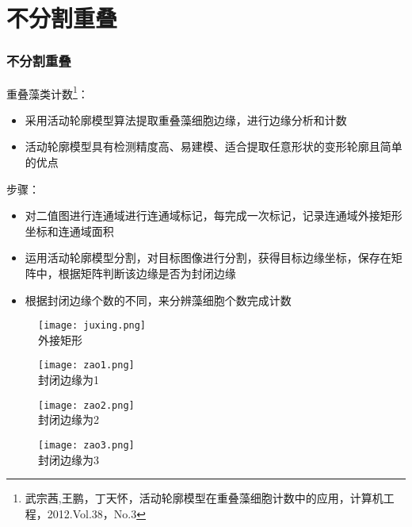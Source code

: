 \documentclass[notheorems,mathserif,table,compress]{beamer}  %
\begin{document}
\section{不分割重叠}
\begin{frame}
    \frametitle{不分割重叠}
    重叠藻类计数\footnote{武宗茜,王鹏，丁天怀，活动轮廓模型在重叠藻细胞计数中的应用，计算机工程，2012.Vol.38，No.3}：
    \begin{itemize}
       \item 采用活动轮廓模型算法提取重叠藻细胞边缘，进行边缘分析和计数
       \item 活动轮廓模型具有检测精度高、易建模、适合提取任意形状的变形轮廓且简单的优点
    \end{itemize}
    步骤：
    \begin{itemize}
       \item 对二值图进行连通域进行连通域标记，每完成一次标记，记录连通域外接矩形坐标和连通域面积
       \item 运用活动轮廓模型分割，对目标图像进行分割，获得目标边缘坐标，保存在矩阵中，根据矩阵判断该边缘是否为封闭边缘
       \item 根据封闭边缘个数的不同，来分辨藻细胞个数完成计数
    \end{itemize}
\end{frame}

\begin{frame}
    \begin{figure}
   \begin{minipage}[t]{0.4\textwidth} 
     \centering 
     \texttt{[image: juxing.png]} \\
     外接矩形
   \end{minipage}
   \begin{minipage}[t]{0.4\textwidth} 
     \centering 
     \texttt{[image: zao1.png]} \\
     封闭边缘为1
   \end{minipage}
   \begin{minipage}[b]{0.4\textwidth} 
     \centering 
     \texttt{[image: zao2.png]} \\
     封闭边缘为2
   \end{minipage}
   \begin{minipage}[b]{0.4\textwidth} 
     \centering 
     \texttt{[image: zao3.png]} \\
     封闭边缘为3
   \end{minipage}
   \end{figure}
\end{frame}
\end{document}
